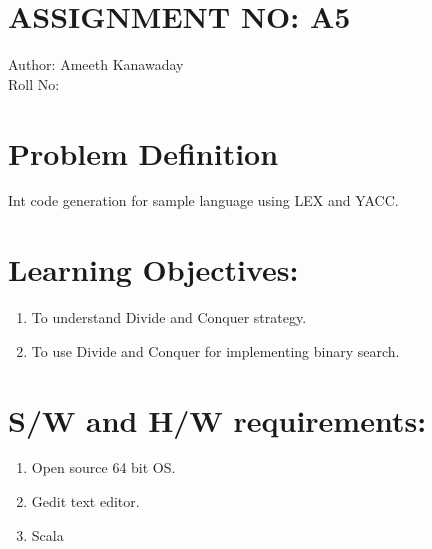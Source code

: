 \documentclass[10pt,a4paper]{article}
\begin{document}
\section{ASSIGNMENT NO: A5}
Author:\:   Ameeth Kanawaday\\
Roll No:\\
\section{Problem Definition}
Int code generation for sample language using LEX and YACC.

\section{Learning Objectives:}
\begin{enumerate}
\item To understand Divide and Conquer strategy.
\item To use Divide and Conquer for implementing binary search.
\end{enumerate}

\section{S/W and H/W requirements:}
\begin{enumerate}
\item Open source 64 bit OS.
\item Gedit text editor.
\item Scala
\end{enumerate}
\end{document}
